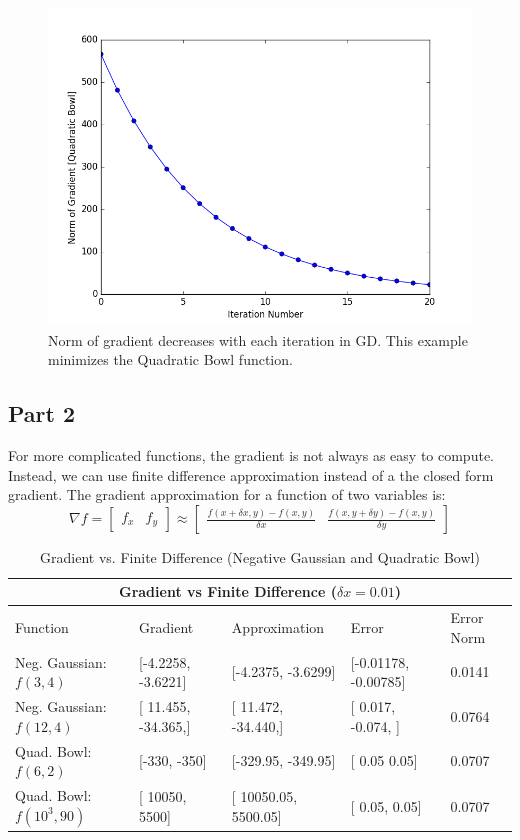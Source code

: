 \begin{figure}
	\centering
	\includegraphics [trim=0 0 0 0, clip, angle=0, width=0.8\columnwidth,
	keepaspectratio]{figures/1_1_gradient}
	\caption{Norm of gradient decreases with each iteration in GD. This example minimizes the Quadratic Bowl function.} 
	\label{fig:gradient} 
\end{figure}


\subsection{Part 2}
For more complicated functions, the gradient is not always as easy to compute.
Instead, we can use finite difference approximation instead of a the closed form gradient.
The gradient approximation for a function of two variables is:
\begin{equation}
\nabla f = \begin{bmatrix}
	f_x & f_y
\end{bmatrix}
\approx \begin{bmatrix}
	\frac{f(x+\delta x, y) - f(x,y)}{\delta x} & \frac{f(x, y+\delta y) - f(x,y)}{\delta y}
\end{bmatrix}
\end{equation}

\begin{table}[t]
  \centering
  \caption[]{Gradient vs. Finite Difference (Negative Gaussian and Quadratic Bowl)}
	\begin{tabular}{|p{3cm}||p{3cm}|p{3cm}|p{3cm}|p{3cm}|}
	 \hline
	 \multicolumn{5}{|c|}{Gradient vs Finite Difference ($\delta x = 0.01$)} \\
	 \hline
	 Function & Gradient & Approximation & Error &Error Norm \\
	 \hline
	 Neg. Gaussian: $f(3,4)$ & [-4.2258, -3.6221] & [-4.2375, -3.6299] & [-0.01178, -0.00785] & 0.0141 \\
	 Neg. Gaussian: $f(12,4)$ & [ 11.455, -34.365,] & [ 11.472, -34.440,] & [ 0.017, -0.074, ] & 0.0764 \\
	 Quad. Bowl: $f(6,2)$ & [-330, -350] & [-329.95, -349.95] & [ 0.05  0.05] & 0.0707\\
	 Quad. Bowl: $f(10^3,90)$ & [ 10050, 5500] & [ 10050.05, 5500.05] & [ 0.05, 0.05] & 0.0707 \\
	 \hline
	\end{tabular}
\end{table}\label{table:gradient}

